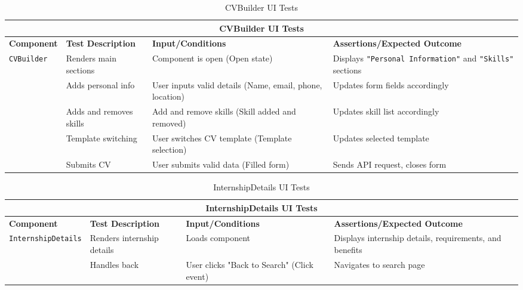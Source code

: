 \begin{table}[ht]
\centering
\begin{tabular}{|p{3cm}|p{4cm}|p{4cm}|p{5cm}|}
\hline
\multicolumn{4}{|c|}{\textbf{CVBuilder UI Tests}} \\
\hline
\textbf{Component} & \textbf{Test Description} & \textbf{Input/Conditions} & \textbf{Assertions/Expected Outcome} \\
\hline
\multirow{5}{*}{\texttt{CVBuilder}}
 & Renders main sections
 & Component is open \newline (Open state)
 & Displays \texttt{"Personal Information"} and \texttt{"Skills"} sections \\ \cline{2-4}
 & Adds personal info
 & User inputs valid details \newline (Name, email, phone, location)
 & Updates form fields accordingly \\ \cline{2-4}
 & Adds and removes skills
 & Add and remove skills \newline (Skill added and removed)
 & Updates skill list accordingly \\ \cline{2-4}
 & Template switching
 & User switches CV template \newline (Template selection)
 & Updates selected template \\ \cline{2-4}
 & Submits CV
 & User submits valid data \newline (Filled form)
 & Sends API request, closes form \\
\hline
\end{tabular}
\caption{CVBuilder UI Tests}
\label{tab:cvbuilder_ui_tests}
\end{table}

\begin{table}[ht]
\centering
\begin{tabular}{|p{3.5cm}|p{4cm}|p{4cm}|p{5cm}|}
\hline
\multicolumn{4}{|c|}{\textbf{InternshipDetails UI Tests}} \\
\hline
\textbf{Component} & \textbf{Test Description} & \textbf{Input/Conditions} & \textbf{Assertions/Expected Outcome} \\
\hline
\multirow{2}{*}{\texttt{InternshipDetails}}
 & Renders internship details 
 & Loads component 
 & Displays internship details, requirements, and benefits \\ \cline{2-4}
 & Handles back
 & User clicks "Back to Search" \newline (Click event)
 & Navigates to search page \\
\hline
\end{tabular}
\caption{InternshipDetails UI Tests}
\label{tab:internshipdetails_ui_tests}
\end{table}


